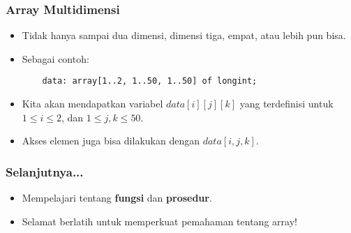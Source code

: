 \documentclass{beamer}
\begin{document}
\begin{frame}[fragile]
\frametitle{Array Multidimensi}
\begin{itemize}
	\item Tidak hanya sampai dua dimensi, dimensi tiga, empat, atau lebih pun bisa.
	\item Sebagai contoh:
	\begin{lstlisting}
	data: array[1..2, 1..50, 1..50] of longint;
	\end{lstlisting}
	\item Kita akan mendapatkan variabel $data[i][j][k]$ yang terdefinisi untuk $1 \le i \le 2$, dan $1 \le j, k \le 50$.
	\item Akses elemen juga bisa dilakukan dengan $data[i,j,k]$.
\end{itemize}
\end{frame}

\begin{frame}
\frametitle{Selanjutnya...}
\begin{itemize}
	\item Mempelajari tentang \textbf{fungsi} dan \textbf{prosedur}.
	\item Selamat berlatih untuk memperkuat pemahaman tentang array!
\end{itemize}
\end{frame}
\end{document}
